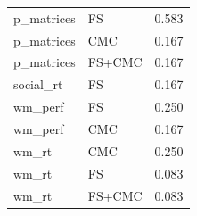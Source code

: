 \documentclass{article}
\begin{document}
\begin{longtable}{llr}
	p\_matrices & FS & 0.583 \\
	p\_matrices & CMC & 0.167 \\
	\vspace{0.2cm}
	p\_matrices & FS+CMC & 0.167 \\
	\vspace{0.2cm}
	social\_rt & FS & 0.167 \\
	wm\_perf & FS & 0.250 \\
	\vspace{0.2cm}
	wm\_perf & CMC & 0.167 \\
	wm\_rt & CMC & 0.250 \\
	wm\_rt & FS & 0.083 \\
	wm\_rt & FS+CMC & 0.083 \\
	\end{longtable}
\end{document}
